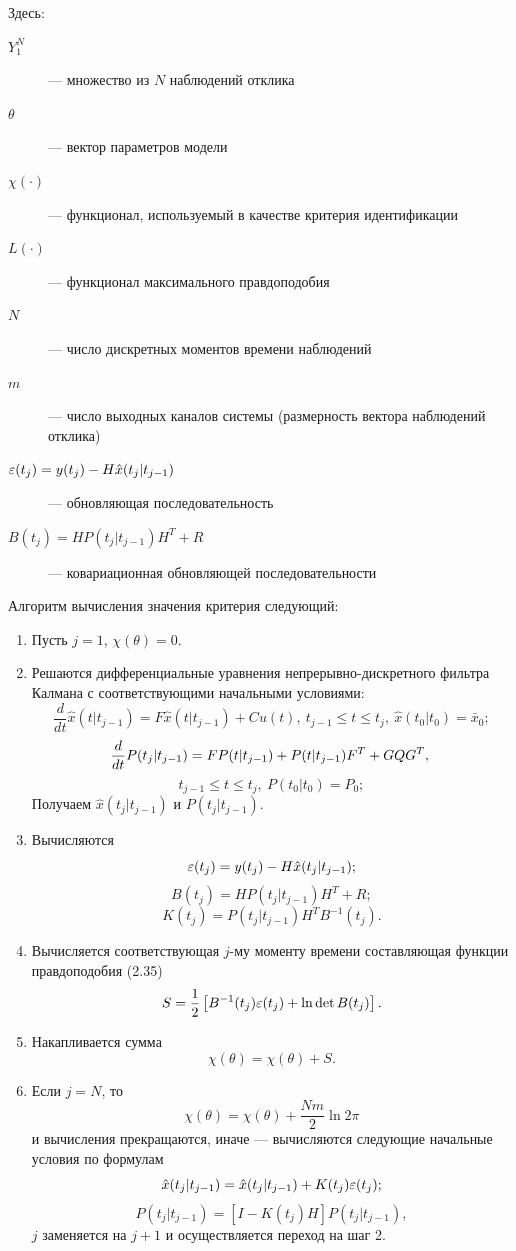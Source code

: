 \documentclass[a4paper,14pt]{extarticle}
\begin{document}
Здесь:

\begin{description}
\item[$Y_1^N$] --- множество из $N$ наблюдений отклика
\item[$\theta$] --- вектор параметров модели 
\item[$\chi(\cdot)$] --- функционал, используемый в качестве критерия
идентификации
\item[$L(\cdot)$] --- функционал максимального правдоподобия 
\item[$N$] --- число дискретных моментов времени наблюдений
\item[$m$] --- число выходных каналов системы (размерность вектора наблюдений
отклика)
\item[$\varepsilon(t_j) = y(t_j) - H \hat{x}(t_j|t_{j-1})$] --- обновляющая
последовательность 
\item[$B(t_j) = HP(t_j|t_{j-1})H^T + R$] --- ковариационная обновляющей
последовательности 
\end{description}

\newpage
Алгоритм вычисления значения критерия следующий:

\begin{enumerate}
\item Пусть $j = 1$, $\chi(\theta) = 0$.
\item Решаются дифференциальные уравнения непрерывно-дискретного фильтра
Калмана с соответствующими начальными условиями:
\[
\frac{d}{dt}\hat{x}(t|t_{j-1}) = F \hat{x}(t|t_{j-1}) + C u(t),\ 
t_{j-1} \le t \le t_j,\ \hat{x}(t_0|t_0) = \bar{x}_0;
\]
\[
\frac{d}{dt}P(t_j|t_{j-1}) = F P(t|t_{j-1}) + P(t|t_{j-1}) F^T + GQG^T,\\
\]
\[
t_{j-1} \le t \le t_j,\ P(t_0|t_0) = P_0;
\]
Получаем $\hat{x}(t_j|t_{j-1})$ и $P(t_j|t_{j-1})$.

\item Вычисляются
\[ \varepsilon(t_j) = y(t_j) - H \hat{x}(t_j|t_{j-1}); \]
\[ B(t_j) = H P(t_j|t_{j-1}) H^T + R; \]
\[
K(t_j) = P(t_j|t_{j-1}) H^T B^{-1}(t_j).
\]

\item Вычисляется соответствующая $j$-му моменту времени составляющая функции
правдоподобия (2.35)
\[
S = \frac{1}{2} \left[ B^{-1}(t_j) \varepsilon(t_j) + \ln \det B(t_j) \right].
\]

\item Накапливается сумма
\[
\chi(\theta) = \chi(\theta) + S.
\]

\item Если $j = N$, то
\[
\chi(\theta) = \chi(\theta) + \frac{Nm}{2} \ln 2\pi
\]
и вычисления прекращаются, иначе --- вычисляются следующие начальные условия по
формулам
\[
\hat{x}(t_j|t_{j-1}) = \hat{x}(t_j|t_{j-1}) + K(t_j) \varepsilon(t_j);
\]
\[
P(t_j|t_{j-1}) = \left[ I - K(t_j) H \right] P(t_j|t_{j-1}),
\]
$j$ заменяется на $j+1$ и осуществляется переход на шаг 2.

\end{enumerate}
\end{document}
